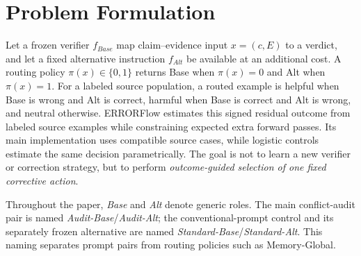 \documentclass[runningheads]{llncs}
\begin{document}
\begin{table}[t]
\caption{Conceptual positioning. Entries summarize the cited method's primary
protocol rather than every possible implementation. ``Outcome memory'' means
stored helpful/harmful action outcomes, not generic retrieved knowledge.}
\label{tab:related}
\centering\small
{}
\end{table}

\section{Problem Formulation}

Let a frozen verifier $f_{Base}$ map claim--evidence input $x=(c,E)$ to a
verdict, and let a fixed alternative instruction $f_{Alt}$ be available at an
additional cost. A routing policy $\pi(x)\in\{0,1\}$ returns Base when
$\pi(x)=0$ and Alt when $\pi(x)=1$. For a labeled source population, a routed
example is helpful when Base is wrong and Alt is correct, harmful when Base is
correct and Alt is wrong, and neutral otherwise. ERRORFlow estimates this
signed residual outcome from labeled source examples while constraining
expected extra forward passes. Its main implementation uses compatible source
cases, while logistic controls estimate the same decision parametrically. The
goal is not to learn a new verifier or correction strategy, but to perform
\emph{outcome-guided selection of one fixed corrective action}.

Throughout the paper, \emph{Base} and \emph{Alt} denote generic roles. The
main conflict-audit pair is named \emph{Audit-Base}/\emph{Audit-Alt}; the
conventional-prompt control and its separately frozen alternative are named
\emph{Standard-Base}/\emph{Standard-Alt}. This naming separates prompt pairs
from routing policies such as Memory-Global.
\end{document}
